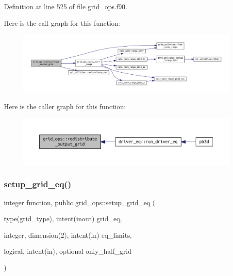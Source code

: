 Definition at line 525 of file grid\+\_\+ops.\+f90.

Here is the call graph for this function\+:
\nopagebreak
\begin{figure}[H]
\begin{center}
\leavevmode
\includegraphics[width=350pt]{namespacegrid__ops_ab10ef5b486ee3861df2da4e53bc22630_cgraph}
\end{center}
\end{figure}
Here is the caller graph for this function\+:
\nopagebreak
\begin{figure}[H]
\begin{center}
\leavevmode
\includegraphics[width=350pt]{namespacegrid__ops_ab10ef5b486ee3861df2da4e53bc22630_icgraph}
\end{center}
\end{figure}
\mbox{\label{namespacegrid__ops_ab749b0904ed8c69253fe8908c2624bcd}} 
\subsubsection{\texorpdfstring{setup\+\_\+grid\+\_\+eq()}{setup\_grid\_eq()}}
{\footnotesize\ttfamily integer function, public grid\+\_\+ops\+::setup\+\_\+grid\+\_\+eq (\begin{DoxyParamCaption}\item[{type(grid\+\_\+type), intent(inout)}]{grid\+\_\+eq,  }\item[{integer, dimension(2), intent(in)}]{eq\+\_\+limits,  }\item[{logical, intent(in), optional}]{only\+\_\+half\+\_\+grid }\end{DoxyParamCaption})}



